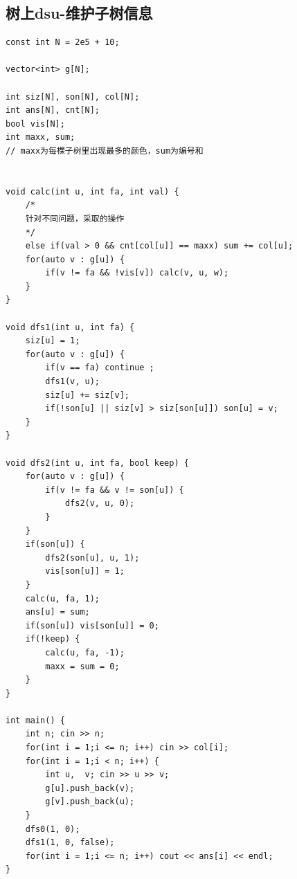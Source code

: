 \documentclass[twoside]{article}
\begin{document}
\subsection{树上dsu-维护子树信息}
\begin{lstlisting}
const int N = 2e5 + 10;

vector<int> g[N];

int siz[N], son[N], col[N];
int ans[N], cnt[N];
bool vis[N];
int maxx, sum;
// maxx为每棵子树里出现最多的颜色，sum为编号和


void calc(int u, int fa, int val) {
    /*
    针对不同问题，采取的操作
    */
    else if(val > 0 && cnt[col[u]] == maxx) sum += col[u];
    for(auto v : g[u]) {
        if(v != fa && !vis[v]) calc(v, u, w);
    }
}

void dfs1(int u, int fa) {
    siz[u] = 1;
    for(auto v : g[u]) {
        if(v == fa) continue ;
        dfs1(v, u);
        siz[u] += siz[v];
        if(!son[u] || siz[v] > siz[son[u]]) son[u] = v;
    }
}

void dfs2(int u, int fa, bool keep) {
    for(auto v : g[u]) {
        if(v != fa && v != son[u]) {
            dfs2(v, u, 0);
        }
    }
    if(son[u]) {
        dfs2(son[u], u, 1);
        vis[son[u]] = 1;
    }
    calc(u, fa, 1);
    ans[u] = sum;
    if(son[u]) vis[son[u]] = 0;
    if(!keep) {
        calc(u, fa, -1);
        maxx = sum = 0;
    }
}

int main() {
    int n; cin >> n;
    for(int i = 1;i <= n; i++) cin >> col[i];
    for(int i = 1;i < n; i++) {
        int u,  v; cin >> u >> v;
        g[u].push_back(v);
        g[v].push_back(u);
    }
    dfs0(1, 0);
    dfs1(1, 0, false);
    for(int i = 1;i <= n; i++) cout << ans[i] << endl;
}
\end{lstlisting}
\end{document}
